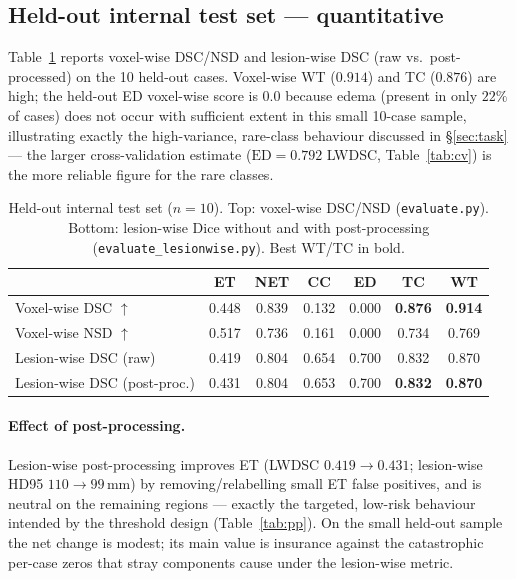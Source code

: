 \documentclass[11pt,a4paper]{article}
\newcommand{\result}[2]{#2}
\begin{document}
\subsection{Held-out internal test set --- quantitative}
Table~\ref{tab:results} reports voxel-wise DSC/NSD and lesion-wise DSC (raw vs.\
post-processed) on the 10 held-out cases. Voxel-wise WT ($0.914$) and TC ($0.876$)
are high; the held-out ED voxel-wise score is $0.0$ because edema (present in only
$22\%$ of cases) does not occur with sufficient extent in this small 10-case sample,
illustrating exactly the high-variance, rare-class behaviour discussed in
\S\ref{sec:task} --- the larger cross-validation estimate ($\text{ED}=0.792$ LWDSC,
Table~\ref{tab:cv}) is the more reliable figure for the rare classes.

\begin{table}[h]
\centering
\caption{Held-out internal test set ($n\!=\!10$). Top: voxel-wise DSC/NSD
(\texttt{evaluate.py}). Bottom: lesion-wise Dice without and with post-processing
(\texttt{evaluate\_lesionwise.py}). Best WT/TC in bold.}
\label{tab:results}
\begin{tabular}{lcccccc}
\toprule
 & ET & NET & CC & ED & \textbf{TC} & \textbf{WT} \\
\midrule
Voxel-wise DSC $\uparrow$ & \result{}{0.448} & \result{}{0.839} & \result{}{0.132}
   & \result{}{0.000} & \textbf{\result{}{0.876}} & \textbf{\result{}{0.914}} \\
Voxel-wise NSD $\uparrow$ & 0.517 & 0.736 & 0.161 & 0.000 & 0.734 & 0.769 \\
\midrule
Lesion-wise DSC (raw)        & 0.419 & 0.804 & 0.654 & 0.700 & 0.832 & 0.870 \\
Lesion-wise DSC (post-proc.) & \result{}{0.431} & 0.804 & 0.653 & 0.700
   & \textbf{0.832} & \textbf{0.870} \\
\bottomrule
\end{tabular}
\end{table}

\paragraph{Effect of post-processing.}
Lesion-wise post-processing improves ET (LWDSC $0.419\!\to\!0.431$; lesion-wise HD95
$110\!\to\!99$\,mm) by removing/relabelling small ET false positives, and is neutral
on the remaining regions --- exactly the targeted, low-risk behaviour intended by the
threshold design (Table~\ref{tab:pp}). On the small held-out sample the net change is
modest; its main value is insurance against the catastrophic per-case zeros that
stray components cause under the lesion-wise metric.
\end{document}
